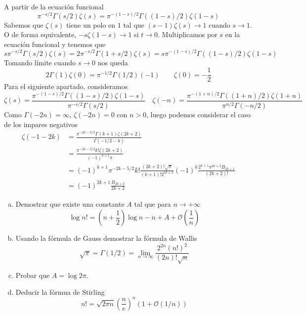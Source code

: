 \documentclass[twoside]{article}
\begin{document}
\begin{solucion}
A partir de la ecuación funcional
$$\pi^{-s/2}\Gamma(s/2)\zeta(s)=\pi^{-(1-s)/2}\Gamma((1-s)/2)\zeta(1-s)$$
Sabemos que $\zeta(s)$ tiene un polo en $1$ tal que $(s-1)\zeta(s)\to 1$ cuando $s\to 1$. O de forma equivalente, $-s\zeta(1-s)\to1$ si $t\to0$. Multiplicamos por $s$ en la ecuación funcional y tenemos que 
$$
s\pi^{-s/2}\Gamma(s/2)\zeta(s) = 2 \pi^{-s/2}\Gamma(1+s/2)\zeta(s) = s\pi^{-(1-s)/2}\Gamma((1-s)/2)\zeta(1-s)
$$
Tomando límite cuando $s\to 0$ nos queda
$$
2\Gamma(1)\zeta(0)=\pi^{-1/2}\Gamma(1/2)(-1) \qquad \zeta(0) = -\frac{1}{2}
$$
Para el siguiente apartado, consideramos 
$$
\zeta(s)=\frac{\pi^{-(1-s)/2}\Gamma((1-s)/2)\zeta(1-s)}{\pi^{-s/2}\Gamma(s/2)} \quad 
\zeta(-n) =\frac{\pi^{-(1+n)/2}\Gamma((1+n)/2)\zeta(1+n)}{\pi^{n/2}\Gamma(-n/2)}
$$
Como $\Gamma(-2n)=\infty$, $\zeta(-2n)=0$ con $n>0$, luego podemos considerar el caso de los impares negativos
\begin{align*}
\zeta(-1-2k) & =\frac{\pi^{-2k-3/2}\Gamma(k+1)\zeta(2k+2)}{\Gamma(-1/2-k)}\\
&=\frac{\pi^{-2k-3/2}k!\zeta(2k+2)}{(-1)^{k+1}\pi}\\
&=(-1)^{k+1}\pi^{-2k-5/2}k!\frac{(2k+2)!\sqrt{\pi}}{(k+1)!2^{2k+2}}(-1)^k\frac{2^{k+1}\pi^{2k+2}B_{2k+1}}{(2k+2)!}\\
&=(-1)^{2k+1}\frac{B_{2k+2}}{2k+2}
\end{align*}
\end{solucion}

\newpage
\begin{ejercicio}{9}
\begin{enumerate}[(a)]
	\item Demostrar que existe una constante $A$ tal que para $n \to +∞$
	\[ \log n! = \left(n+\frac{1}{2}\right)\log n - n + A + \mathcal{O}\left(\frac{1}{n}\right)\]
	
	\item Usando la fórmula de Gauss demostrar la fórmula de Wallis
	\[ \sqrt{π} = Γ(1/2) = \lim_{n\to∞} \frac{2^{2n}(n!)^2}{(2n)!\sqrt{n}} \]
	
	\item Probar que $A = \log {2π}$.
	\item Deducir la fórmua de Stirling
	\[ n! = \sqrt{2πn} \left(\frac{n}{e}\right)^n (1 + \mathcal{O}(1/n)) \]
\end{enumerate}
\end{ejercicio}
\begin{solucion}
\end{solucion}
\end{document}
